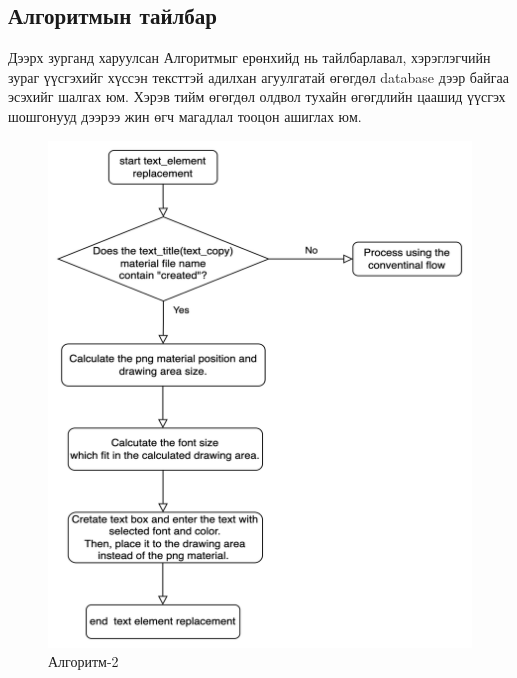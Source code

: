 \subsection{Алгоритмын тайлбар}
Дээрх зурганд харуулсан Алгоритмыг ерөнхийд нь тайлбарлавал, хэрэглэгчийн зураг үүсгэхийг хүссэн тексттэй адилхан агуулгатай өгөгдөл database дээр байгаа эсэхийг шалгах юм. Хэрэв тийм өгөгдөл олдвол тухайн өгөгдлийн цаашид үүсгэх шошгонууд дээрээ жин өгч магадлал тооцон ашиглах юм.
\begin{figure}
	\centering
	\includegraphics[scale=0.6]{src/pictures/algorithm2.png}
	\caption{Алгоритм-2}
\end{figure}
